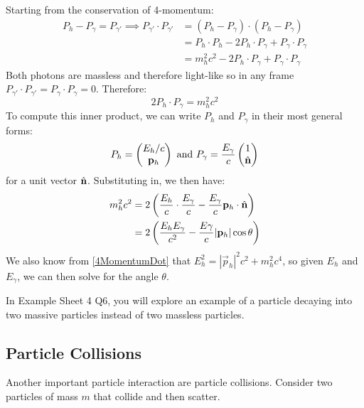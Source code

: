 \documentclass[../main.tex]{subfiles}
\begin{document}
Starting from the conservation of 4-momentum:
\begin{align*}
  P_h - P_\gamma = P_{\gamma'} \implies P_{\gamma'} \cdot P_{\gamma'} &= (P_{h} - P_{\gamma}) \cdot (P_{h} - P_{\gamma}) \\
                                                                      &= P_h \cdot P_h - 2P_h \cdot P_\gamma + P_{\gamma} \cdot P_{\gamma} \\
                                                                      &= m^2_h c^2 - 2P_h \cdot P_{\gamma} + P_{\gamma} \cdot P_{\gamma}
\end{align*}
Both photons are massless and therefore light-like so in any frame $P_{\gamma'} \cdot P_{\gamma'} = P_{\gamma} \cdot P_{\gamma} = 0$.
Therefore:
\[
  2 P_h \cdot P_{\gamma} = m_h^2 c^2
\]
To compute this inner product, we can write $P_h$ and $P_\gamma$ in their most general forms:
\[
  P_{h} = \begin{pmatrix}
  E_h/c \\
  \mathbf{\bm{p}}_{h} \\
  \end{pmatrix} \text{ and } P_{\gamma} = \frac{E_\gamma}{c} \begin{pmatrix}
  1 \\
  \hat{\mathbf{\bm{n}}} \\
  \end{pmatrix}
\]
for a unit vector $\hat{\mathbf{\bm{n}}}$.
Substituting in, we then have:
\begin{align*}
  m_h^2 c^2 &= 2\left(\frac{E_h}{c} \cdot \frac{E_{\gamma}}{c} - \frac{E_{\gamma}}{c} \mathbf{\bm{p}}_h \cdot \hat{\mathbf{\bm{n}}}\right) \\
            &= 2 \left(\frac{E_h E_\gamma}{c^2} - \frac{E\gamma}{c}|\mathbf{\bm{p}}_h|\cos\theta\right)
\end{align*}
We also know from \cref{4MomentumDot} that $E_h^2 = |\vec{p}_h|^2 c^2 + m_h^2 c^4$, so given $E_h$ and $E_\gamma$, we can then solve for the angle $\theta$.
\begin{remark}
  In Example Sheet 4 Q6, you will explore an example of a particle decaying into two massive particles instead of two massless particles.
\end{remark}
\subsection{Particle Collisions}
Another important particle interaction are particle collisions.
Consider two particles of mass $m$ that collide and then scatter.
\end{document}
